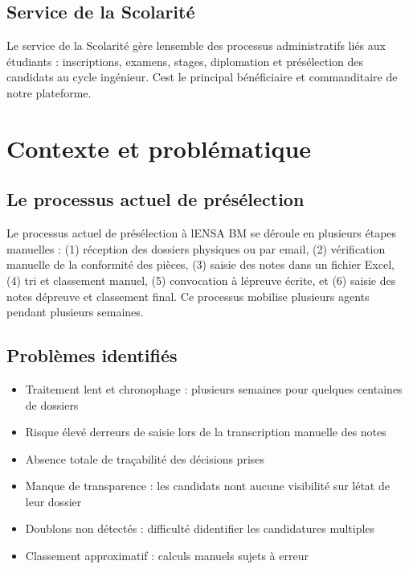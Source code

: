 \subsection{Service de la
Scolarité}

Le service de la Scolarité gère l\textquotesingle ensemble des processus
administratifs liés aux étudiants : inscriptions, examens, stages,
diplomation et présélection des candidats au cycle ingénieur.
C\textquotesingle est le principal bénéficiaire et commanditaire de
notre plateforme.

\section{Contexte et
problématique}

\subsection{Le processus actuel de
présélection}

Le processus actuel de présélection à l\textquotesingle ENSA BM se
déroule en plusieurs étapes manuelles : (1) réception des dossiers
physiques ou par email, (2) vérification manuelle de la conformité des
pièces, (3) saisie des notes dans un fichier Excel, (4) tri et
classement manuel, (5) convocation à l\textquotesingle épreuve écrite,
et (6) saisie des notes d\textquotesingle épreuve et classement final.
Ce processus mobilise plusieurs agents pendant plusieurs semaines.

\subsection{Problèmes
identifiés}

\begin{itemize}
\item
  Traitement lent et chronophage : plusieurs semaines pour quelques
  centaines de dossiers
\item
  Risque élevé d\textquotesingle erreurs de saisie lors de la
  transcription manuelle des notes
\item
  Absence totale de traçabilité des décisions prises
\item
  Manque de transparence : les candidats n\textquotesingle ont aucune
  visibilité sur l\textquotesingle état de leur dossier
\item
  Doublons non détectés : difficulté d\textquotesingle identifier les
  candidatures multiples
\item
  Classement approximatif : calculs manuels sujets à erreur
\end{itemize}

